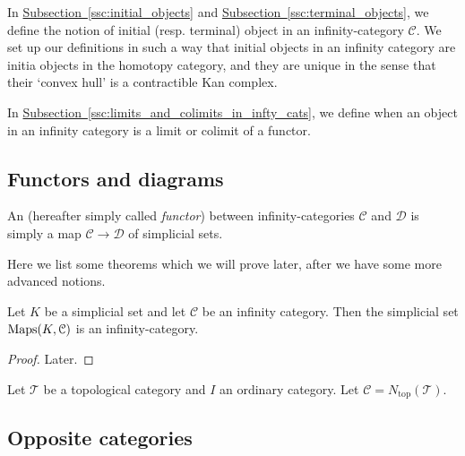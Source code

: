 \documentclass[main.tex]{subfiles}
\begin{document}
In \hyperref[ssc:initial_objects]{Subsection~\ref*{ssc:initial_objects}} and \hyperref[ssc:terminal_objects]{Subsection~\ref*{ssc:terminal_objects}}, we define the notion of initial (resp. terminal) object in an infinity-category $\mathcal{C}$. We set up our definitions in such a way that initial objects in an infinity category are initia objects in the homotopy category, and they are unique in the sense that their `convex hull' is a contractible Kan complex.

In \hyperref[ssc:limits_and_colimits_in_infty_cats]{Subsection~\ref*{ssc:limits_and_colimits_in_infty_cats}}, we define when an object in an infinity category is a limit or colimit of a functor.

\subsection{Functors and diagrams}
\label{ssc:functors_and_diagrams}

\begin{definition}
  \label{def:infinity_functor}
  An  (hereafter simply called \emph{functor}) between infinity-categories $\mathcal{C}$ and $\mathcal{D}$ is simply a map $\mathcal{C} \to \mathcal{D}$ of simplicial sets.
\end{definition}

Here we list some theorems which we will prove later, after we have some more advanced notions.

\begin{proposition}
  Let $K$ be a simplicial set and let $\mathcal{C}$ be an infinity category. Then the simplicial set $\operatorname{Maps}(K, \mathcal{C})$ is an infinity-category.
\end{proposition}
\begin{proof}
  Later.
\end{proof}

\begin{definition}
  \label{def:homotopy_coherent_diagram}
  Let $\mathcal{T}$ be a topological category and $I$ an ordinary category. Let $\mathcal{C} = N_{\mathrm{top}}(\mathcal{T})$.
\end{definition}


\subsection{Opposite categories}
\label{ssc:opposite_categories}
\end{document}
